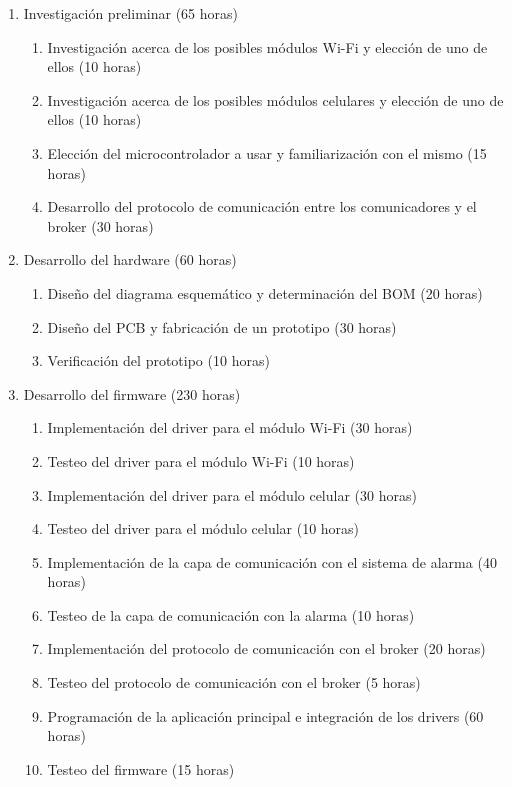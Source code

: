 \documentclass[
11pt, %
]{charter}
\begin{document}
\begin{enumerate}
	\item Investigación preliminar (65 horas)
		\begin{enumerate}
			\item Investigación acerca de los posibles módulos Wi-Fi y elección de uno de ellos (10 horas)
			\item Investigación acerca de los posibles módulos celulares y elección de uno de ellos (10 horas)
			\item Elección del microcontrolador a usar y familiarización con el mismo (15 horas)
			\item Desarrollo del protocolo de comunicación entre los comunicadores y el broker (30 horas)
		\end{enumerate}
	\item Desarrollo del hardware (60 horas)
		\begin{enumerate}
			\item Diseño del diagrama esquemático y determinación del BOM (20 horas)
			\item Diseño del PCB y fabricación de un prototipo (30 horas)
			\item Verificación del prototipo (10 horas)
		\end{enumerate}
	\item Desarrollo del firmware (230 horas)
		\begin{enumerate}
			\item Implementación del driver para el módulo Wi-Fi (30 horas)
			\item Testeo del driver para el módulo Wi-Fi (10 horas)
			\item Implementación del driver para el módulo celular (30 horas)
			\item Testeo del driver para el módulo celular (10 horas)
			\item Implementación de la capa de comunicación con el sistema de alarma (40 horas)
			\item Testeo de la capa de comunicación con la alarma (10 horas)
			\item Implementación del protocolo de comunicación con el broker (20 horas)
			\item Testeo del protocolo de comunicación con el broker (5 horas)
			\item Programación de la aplicación principal e integración de los drivers (60 horas)
			\item Testeo del firmware (15 horas)
		\end{enumerate}

\end{enumerate}
\end{document}
